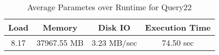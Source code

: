 \documentclass[../../main.tex]{subfiles}
\begin{document}
    \begin{table}
        \begin{center}
            \begin{tabular}{ |c|c|c|c| } 
            \hline
            Load & Memory & Disk IO & Execution Time\\
            \hline
            8.17 & 37967.55 MB & 3.23 MB/sec & 74.50 sec \\
            \hline
            \end{tabular}
            \\[1pt]
            \caption{Average Parametes over Runtime for Query22}
        \end{center}
    \end{table}
    \pagebreak
\end{document}

